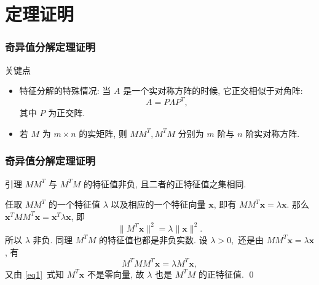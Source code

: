 
\section{定理证明}


\begin{frame}
\frametitle{奇异值分解定理证明}

\begin{block}{关键点}
\begin{itemize}
\item<2-> 特征分解的特殊情况: 当 $A$ 是一个实对称方阵的时候, 它正交相似于对角阵:
\[A = P\Lambda P^T,\]
其中 $P$ 为正交阵.
\vspace{1em}
\item<3-> 若 $M$ 为 $m\times n$ 的实矩阵, 则 $MM^T, M^TM$ 分别为 $m$ 阶与 $n$ 阶实对称方阵.
\end{itemize}
\end{block}

\end{frame}



\begin{frame}
\frametitle{奇异值分解定理证明}

\begin{block}{引理}
\centering
$MM^T$ 与 $M^TM$ 的特征值非负, 且二者的正特征值之集相同.
\end{block}

\pause

\startproof[bg=yellow, fg=red]
任取 $MM^T$ 的一个特征值 $\lambda$ 以及相应的一个特征向量 $\mathbf{x}$, 即有 $MM^T\mathbf{x} = \lambda\mathbf{x}$. 那么 $\mathbf{x}^TMM^T\mathbf{x} = \mathbf{x}^T\lambda\mathbf{x}$, 即
\begin{equation*}
\lVert M^T\mathbf{x} \rVert^2 = \lambda \lVert \mathbf{x} \rVert^2.
\tag{$\star$}
\label{eq1}
\end{equation*}
所以 $\lambda$ 非负. 同理 $M^TM$ 的特征值也都是非负实数. \newline\pause
设 $\lambda > 0,$ 还是由 $MM^T\mathbf{x} = \lambda\mathbf{x}$, 有
\begin{equation*}
M^TMM^T\mathbf{x} = \lambda M^T\mathbf{x},
\tag{$\star\star$}
\label{eq2}
\end{equation*}
又由 \eqref{eq1}~式知 $M^T\mathbf{x}$ 不是零向量, 故 $\lambda$ 也是 $M^TM$ 的正特征值.
\qed

\end{frame}

